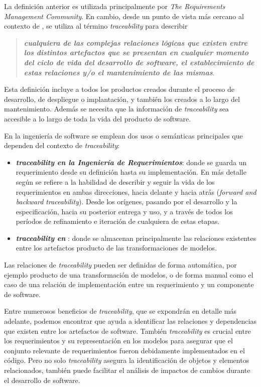 \documentclass[a4paper,12pt,twoside,spanish,openright]{book}
\begin{document}
La definición anterior es utilizada principalmente por \textit{The Requirements Management Community}. En cambio, desde un punto de vista más cercano al contexto de , se utiliza al término \textit{traceability} para describir 
\begin{quote}
\small \textit{\textbf{cualquiera de las complejas relaciones lógicas que existen entre los distintos artefactos que se presentan en cualquier momento del ciclo de vida del desarrollo de software, el establecimiento de estas relaciones y/o el mantenimiento de las mismas}}.
\end{quote}

Esta definición incluye a todos los productos creados durante el proceso de desarrollo, de despliegue o implantación, y también los creados a lo largo del mantenimiento. Además se necesita que la información de \textit{traceability} sea accesible a lo largo de toda la vida del producto de software.


En la ingeniería de software se emplean dos usos o semánticas principales que dependen del contexto de \textit{traceability}:

\begin{itemize}

\item \textit{\textbf{traceability en la Ingeniería de Requerimientos}}: donde se guarda un requerimiento desde su definición hasta su implementación. En más detalle según \cite{GotelFinkelstein} se refiere a la habilidad de describir y seguir la vida de los requerimientos en ambas direcciones, hacia delante y hacia atrás (\textit{forward and backward traceability}). Desde los orígenes, pasando por el desarrollo y la especificación, hacia su posterior entrega y uso, y a través de todos los períodos de refinamiento e iteración de cualquiera de estas etapas.

\item \textit{\textbf{traceability en }}: donde se almacenan principalmente las relaciones existentes entre los artefactos producto de las transformaciones de modelos.

\end{itemize}


Las relaciones de \textit{traceability} pueden ser definidas de forma automática, por ejemplo producto de una transformación de modelos, o de forma manual como el caso de una relación de implementación entre un requerimiento y un componente de software.

Entre numerosos beneficios de \textit{traceability}, que se expondrán en detalle más adelante, podemos encontrar que ayuda a identificar las relaciones y dependencias que existen entre los artefactos de software. También \textit{traceability} es crucial entre los requerimientos y su representación en los modelos para asegurar que el conjunto relevante de requerimientos fueron debidamente implementados en el código. Pero no solo \textit{traceability} asegura la identificación de objetos y elementos relacionados, también puede facilitar el análisis de impactos de cambios durante el desarrollo de software.
\end{document}
